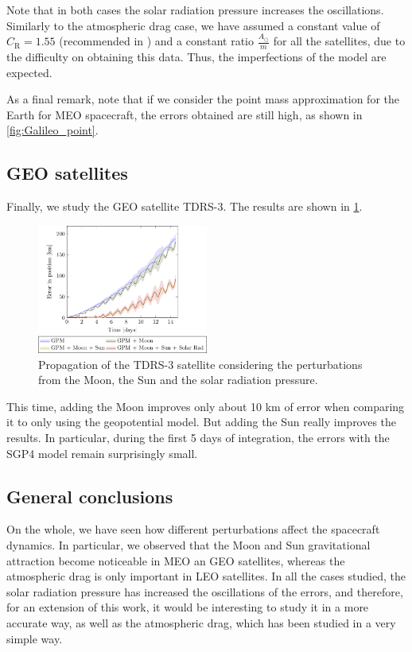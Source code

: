 \documentclass[../main.tex]{subfiles}
\begin{document}
Note that in both cases the solar radiation pressure increases the oscillations. Similarly to the atmospheric drag case, we have assumed a constant value of $C_\mathrm{R}=1.55$ (recommended in \cite{montenbruck}) and a constant ratio $\frac{A_\odot}{m}$ for all the satellites, due to the difficulty on obtaining this data. Thus, the imperfections of the model are expected.

As a final remark, note that if we consider the point mass approximation for the Earth for MEO spacecraft, the errors obtained are still high, as shown in \cref{fig:Galileo_point}.

\subsection{GEO satellites}
Finally, we study the GEO satellite TDRS-3. The results are shown in \cref{fig:TDRS}.
\begin{figure}[ht]
  \centering
  \includegraphics[width=0.5\textwidth]{Images/simulation/TDRS-3.pdf}
  \caption{Propagation of the TDRS-3 satellite considering the perturbations from the Moon, the Sun and the solar radiation pressure.}
  \label{fig:TDRS}
\end{figure}

This time, adding the Moon improves only about 10 km of error when comparing it to only using the geopotential model. But adding the Sun really improves the results. In particular, during the first 5 days of integration, the errors with the SGP4 model remain surprisingly small.

\subsection{General conclusions}
On the whole, we have seen how different perturbations affect the spacecraft dynamics. In particular, we observed that the Moon and Sun gravitational attraction become noticeable in MEO an GEO satellites, whereas the atmospheric drag is only important in LEO satellites. In all the cases studied, the solar radiation pressure has increased the oscillations of the errors, and therefore, for an extension of this work, it would be interesting to study it in a more accurate way, as well as the atmospheric drag, which has been studied in a very simple way.
\end{document}
